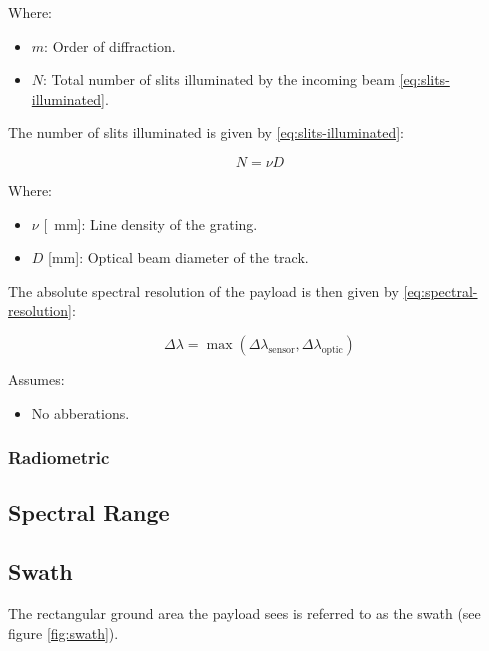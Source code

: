 \documentclass{article}
\begin{document}
Where:
\begin{itemize}[label={}]
    \item $m$: Order of diffraction.
    \item $N$: Total number of slits illuminated by the incoming beam \eqref{eq:slits-illuminated}.
\end{itemize}

The number of slits illuminated is given by \eqref{eq:slits-illuminated}:

\begin{equation} \label{eq:slits-illuminated}
    N = \nu D
\end{equation}

Where:
\begin{itemize}[label={}]
    \item $\nu$ [\si{\per\mm}]: Line density of the grating.
    \item $D$ [\si{\mm}]: Optical beam diameter of the track.
\end{itemize}

The absolute spectral resolution of the payload is then given by \eqref{eq:spectral-resolution}:

\begin{equation} \label{eq:spectral-resolution}
    \Delta\lambda = \max\left( \Delta\lambda_{\text{sensor}},\Delta\lambda_{\text{optic}} \right)
\end{equation}

Assumes:
\begin{itemize}
    \item No abberations. 
\end{itemize}

\subsubsection{Radiometric}

\subsection{Spectral Range}

\subsection{Swath}
The rectangular ground area the payload sees is referred to as the swath (see figure \ref{fig:swath}).
\end{document}
